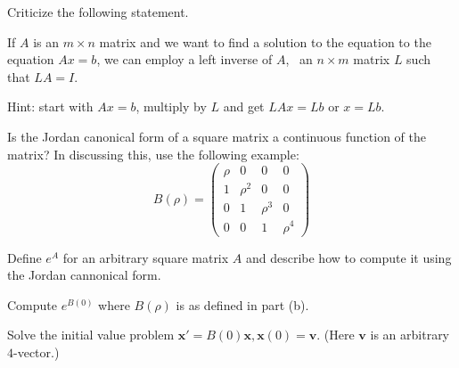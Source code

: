 \begin{alist}
\item Criticize the following statement.

If $A$ is an $m\times n$ matrix and we want to find a solution to the
equation to the equation $Ax=b$, we can employ a left inverse of $A$,
\ie\ an $n\times m$ matrix $L$ such that $LA=I$. 

Hint: start with $Ax=b$, multiply by $L$ and get $LAx=Lb$ or $x=Lb$.
\item Is the Jordan canonical form of a square matrix a continuous
function of the matrix? In discussing this, use the following example:
$$B(\rho)=
\left(\begin{array}{cccc}
\rho & 0 & 0 & 0 \\
1 & \rho^2 & 0 & 0 \\ 0 & 1 & \rho^3 & 0 \\ 0 & 0 & 1 & \rho^4
\end{array}\right)$$
\item Define $e^A$ for an arbitrary square matrix $A$ and describe how
to compute it using the Jordan cannonical form.
\item Compute $e^{B(0)}$ where $B(\rho)$ is as defined in part (b).
\item Solve the initial value problem $\mathbf{x}'=B(0)\mathbf{x},
\mathbf{x}(0)=\mathbf{v}$. (Here $\mathbf{v}$ is an arbitrary
$4$-vector.)
\end{alist}
